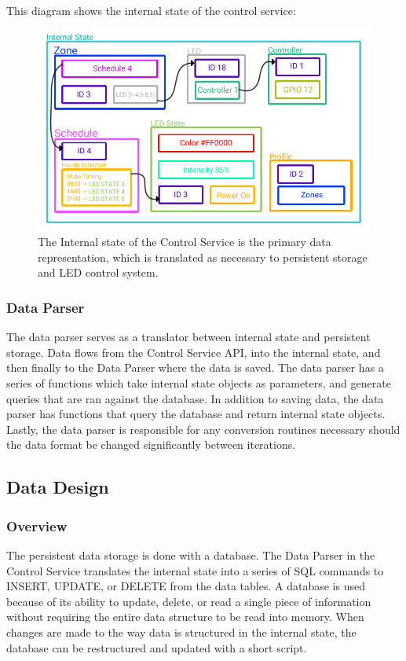 \documentclass[onecolumn, draftclsnofoot,10pt, compsoc]{IEEEtran}
\begin{document}
			\noindent \\This diagram shows the internal state of the control service:

			\begin{center}
				\begin{figure}[H]
					\includegraphics[width=\linewidth]{systemDiagrams/internalstate.png}
					\caption{The Internal state of the Control Service is the primary data representation, which is translated as necessary to persistent storage and LED control system.}
					\label{fig:internalStateDiagram}
				\end{figure}
			\end{center}

			\subsubsection{Data Parser}
			The data parser serves as a translator between internal state and persistent storage.
			Data flows from the Control Service API, into the internal state, and then finally to the Data Parser where the data is saved.
			The data parser has a series of functions which take internal state objects as parameters, and generate queries that are ran against the database.
			In addition to saving data, the data parser has functions that query the database and return internal state objects.
			Lastly, the data parser is responsible for any conversion routines necessary should the data format be changed significantly between iterations.


		\subsection{Data Design}
			\subsubsection{Overview}
			The persistent data storage is done with a database.
			The Data Parser in the Control Service translates the internal state into a series of SQL commands to INSERT, UPDATE, or DELETE from the data tables.
			A database is used because of its ability to update, delete, or read a single piece of information without requiring the entire data structure to be read into memory.
			When changes are made to the way data is structured in the internal state, the database can be restructured and updated with a short script.
\end{document}

